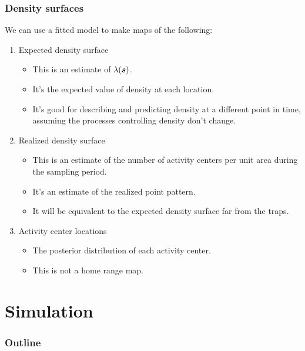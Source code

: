 \documentclass[color=usenames,dvipsnames]{beamer}\usepackage[]{graphicx}\usepackage[]{xcolor}
\begin{document}
\begin{frame}
  \frametitle{Density surfaces}
  \large
  We can use a fitted model to make maps of the following: 
  \begin{enumerate}
    \item<1-> Expected density surface%
    \begin{itemize}
      \item This is an estimate of $\lambda({\bm s})$.
      \item It's the expected value of density at  each location.
      \item It's good for describing and predicting density at a
        different point in time, assuming the processes controlling
        density don't change.
    \end{itemize}
    \item<2-> Realized density surface%
      \begin{itemize}
        \item This is an estimate of the number of activity centers
          per unit area \alert{during the sampling period}.
        \item It's an estimate of the realized point pattern.
        \item It will be equivalent to the expected density surface
          far from the traps. 
      \end{itemize}
    \item<3-> Activity center locations%
      \begin{itemize}
        \item The posterior distribution of each activity center.
        \item This is not a home range map.
      \end{itemize}
  \end{enumerate}
\end{frame}



\section{Simulation}


\begin{frame}
  \frametitle{Outline}
  \Large
  \tableofcontents[currentsection]
\end{frame}
\end{document}
